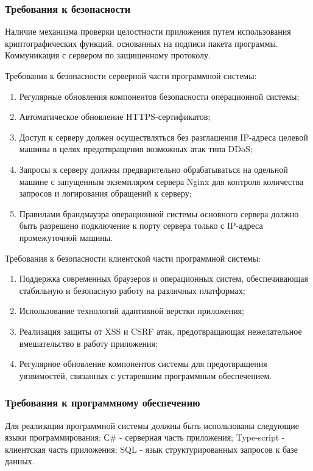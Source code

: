 \subsubsection{Требования к безопасности}
Наличие механизма проверки целостности приложения путем использования криптографических функций, основанных на подписи пакета программы. Коммуникация с сервером по защищенному протоколу.

Требования к безопасности серверной части программной системы:
\begin{enumerate}
\item Регулярные обновления компонентов безопасности операционной системы;
\item Автоматическое обновление HTTPS-сертификатов;
\item Доступ к серверу должен осуществляться без разглашения IP-адреса целевой машины в целях предотвращения возможных атак типа DDoS;
\item Запросы к серверу должны предварительно обрабатываться на одельной машине с запущенным экземпляром сервера Nginx для контроля количества запросов и логирования обращений к серверу;
\item Правилами брандмауэра операционной системы основного сервера должно быть разрешено подключение к порту сервера только с IP-адреса промежуточной машины.
\end{enumerate}

Требования к безопасности клиентской части программной системы:
\begin{enumerate}
\item Поддержка современных браузеров и операционных систем, обеспечивающая стабильную и безопасную работу на различных платформах;
\item Использование технологий адаптивной верстки приложения;
\item Реализация защиты от XSS и CSRF атак, предотвращающая нежелательное вмешательство в работу приложения;
\item Регулярное обновление компонентов системы для предотвращения уязвимостей, связанных с устаревшим программным обеспечением.
\end{enumerate}

\subsubsection{Требования к программному обеспечению}
Для реализации программной системы должны быть использованы следующие языки программирования:
С\# -\- серверная часть приложения;
Type-script -\- клиентская часть приложения;
SQL -\- язык структурированных запросов к базе данных.

